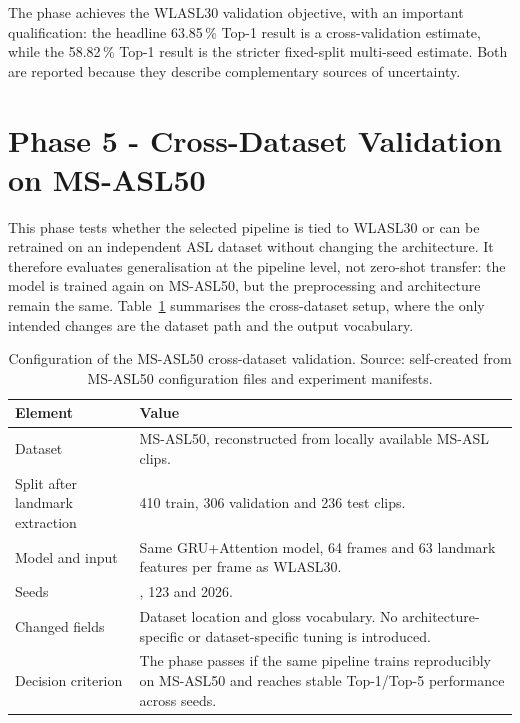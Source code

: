 The phase achieves the WLASL30 validation objective, with an important qualification: the headline
63.85\,\% Top-1 result is a cross-validation estimate, while the 58.82\,\% Top-1 result is the
stricter fixed-split multi-seed estimate. Both are reported because they describe complementary
sources of uncertainty.

\section{Phase 5 - Cross-Dataset Validation on MS-ASL50}
\label{sec:exp_msasl}

This phase tests whether the selected pipeline is tied to WLASL30 or can be retrained on an
independent ASL dataset without changing the architecture. It therefore evaluates generalisation at
the pipeline level, not zero-shot transfer: the model is trained again on MS-ASL50, but the
preprocessing and architecture remain the same. Table~\ref{tab:exp_msasl_config} summarises the
cross-dataset setup, where the only intended changes are the dataset path and the output
vocabulary.

\begin{table}[!htbp]
    \centering
    \small
    \renewcommand{\arraystretch}{1.25}
    \caption{Configuration of the MS-ASL50 cross-dataset validation. Source: self-created from MS-ASL50 configuration files and experiment manifests.}
    \label{tab:exp_msasl_config}
    \begin{tabularx}{\linewidth}{@{}>{\RaggedRight\arraybackslash}p{3.2cm} >{\RaggedRight\arraybackslash}X@{}}
        \toprule
        \textbf{Element}                & \textbf{Value}                                                                                                                 \\
        \midrule
        Dataset                         & MS-ASL50, reconstructed from locally available MS-ASL clips.                                                                   \\
        Split after landmark extraction & 1{,}410 train, 306 validation and 236 test clips.                                                                              \\
        Model and input                 & Same GRU+Attention model, 64 frames and 63 landmark features per frame as WLASL30.                                             \\
        Seeds                           & 42, 123 and 2026.                                                                                                              \\
        Changed fields                  & Dataset location and gloss vocabulary. No architecture-specific or dataset-specific tuning is introduced.                      \\
        Decision criterion              & The phase passes if the same pipeline trains reproducibly on MS-ASL50 and reaches stable Top-1/Top-5 performance across seeds. \\
        \bottomrule
    \end{tabularx}
\end{table}

